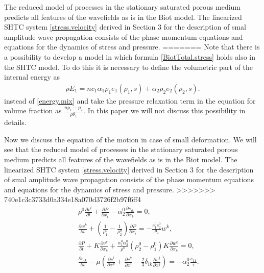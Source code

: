 \documentclass[3p,times]{elsarticle}
\begin{document}
The reduced model of processes in the stationary saturated porous medium predicts all features of the wavefields as is in the Biot model.   The linearized SHTC system \eqref{stress.velocity} derived in Section 3 for the description of smal amplitude wave propagation consists of the phase momentum equations and equations for the dynamics of stress and pressure. 
=======
Note that there is a possibility to develop a model in which formula \eqref{BiotTotal.stress} 
holds also in the SHTC model.
To do this it is necessary to define the volumetric part of the internal energy as
\begin{align*} 
	\rho E_1=n c_1 \alpha_1 \rho_1e_1(\rho_1,s)+\alpha_2 \rho_2 e_2(\rho_2,s). 
\end{align*}
instead of \eqref{energy.mix}
and take the pressure relaxation term in the equation for volume fraction as
$\frac{ n p_1-p_2}{\rho \theta_1}$. In this paper we will not discuss this possibility in details.   

Now we discuss the equation of the motion in case of small deformation.
We will see that the reduced model of processes in the stationary saturated porous medium predicts all features of the wavefields as is in the Biot model.   The linearized SHTC system \eqref{stress.velocity} derived in Section 3 for the description of smal amplitude wave propagation consists of the phase momentum equations and equations for the dynamics of stress and pressure. 
>>>>>>> 740e1c3c3733d0a334e18a070d3726f2b97f6ff4
\begin{eqnarray*} \label{stress.velocity}
&& \rho^0 \frac{\partial v^i}{\partial t}+\frac{\partial P}{\partial x_i}-
\alpha^0_2 \frac{\partial s_{ik}}{\partial x_k} = 0, \nonumber \\
&& \frac{\partial w^k}{\partial t}+ \left(\frac{1}{\rho_1^0} - \frac{1}{\rho_2^0}\right)\frac{\partial P}{\partial x_i}=
-\frac{c_1^0c_2^0}{\theta_2}w^k,  \\
&& \frac{\partial P}{\partial t} +K\frac{\partial v^k}{\partial x_k}+
\frac{\alpha_1^0\alpha_2^0}{\rho^0}\left(\rho^0_2-\rho^0_1 \right)
K\frac{\partial w^k}{\partial x_k} =0,  \nonumber \\
&&\frac{\partial s_{ik}}{\partial t} - 
\mu\left(\frac{\partial v^i}{\partial x^k} +\frac{\partial v^k}{\partial x^i}-
\frac{2}{3}\delta_{ik}\frac{\partial v^j}{\partial x^j} \right) = - \alpha_2^0 \frac{s_{11}}{\tau}.
\nonumber 
\end{eqnarray*}
\end{document}
